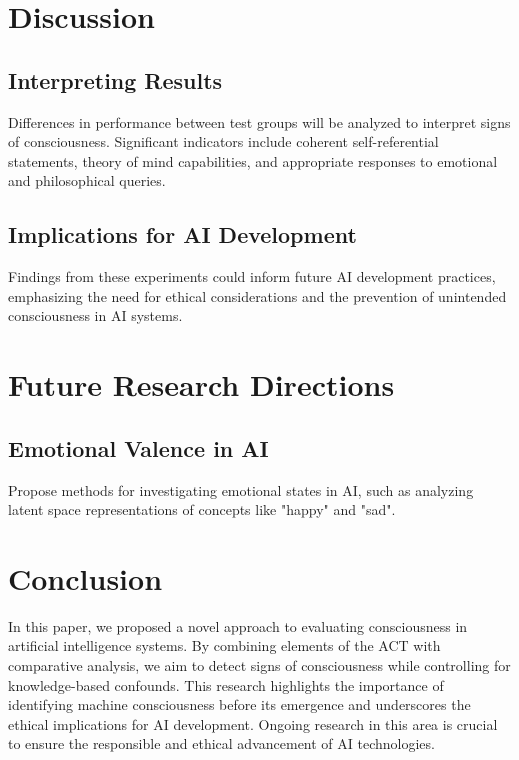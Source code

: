 \documentclass{article}
\begin{document}
\section{Discussion}
\subsection{Interpreting Results}
Differences in performance between test groups will be analyzed to interpret signs of consciousness. Significant indicators include coherent self-referential statements, theory of mind capabilities, and appropriate responses to emotional and philosophical queries.

\subsection{Implications for AI Development}
Findings from these experiments could inform future AI development practices, emphasizing the need for ethical considerations and the prevention of unintended consciousness in AI systems.

\section{Future Research Directions}
\subsection{Emotional Valence in AI}
Propose methods for investigating emotional states in AI, such as analyzing latent space representations of concepts like "happy" and "sad".

\section{Conclusion}
In this paper, we proposed a novel approach to evaluating consciousness in artificial intelligence systems. By combining elements of the ACT with comparative analysis, we aim to detect signs of consciousness while controlling for knowledge-based confounds. This research highlights the importance of identifying machine consciousness before its emergence and underscores the ethical implications for AI development. Ongoing research in this area is crucial to ensure the responsible and ethical advancement of AI technologies.
\end{document}
